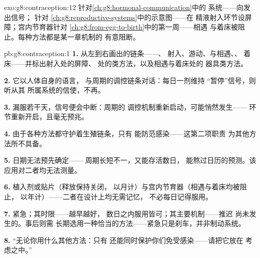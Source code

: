 \begin{solution}{exo:g8:contraception:12}
针对\cref{ch:g8:hormonal-communication}中的
系统——向发出信号；
针对
\cref{ch:g8:reproductive-systems}中的示意图——在
精液射入环节设屏障；宫内节育器针对
\cref{ch:g8:from-egg-to-birth}中的第一周——相遇
与着床被阻止。每种方法都是某一章机制的
有意阻断。
\end{solution}

\begin{solution}{pb:g8:contraception:1}
\textbf{1.} 从左到右画出的链条——、
射入、游动、与相遇、、
着床——并标出射入处的屏障、
处的类方法，以及相遇与着床处的
器具类方法。

\textbf{2.} 它以人体自身的语言，
与周期的调控链条对话：每日一剂维持
“暂停”信号，则听从其
所属系统的信使，不再。

\textbf{3.} 漏服若干天，信号便会中断：周期的
调控机制重新启动，可能悄然发生——
环节重新开启，且毫无预兆。

\textbf{4.} 由于各种方法都守护着生殖链条，只有
能防范感染——这第二项职责
为其他方法所不具备。

\textbf{5.} 日期无法预先确定——
周期长短不一，又能存活数日，
能熬过日历的预测。该应用对二者均无法测量。

\textbf{6.} 植入剂或贴片（释放保持关闭，
以月计）与宫内节育器（相遇与着床均被阻止，
以年计）——二者在设计上均无需记忆，
不必每日记得服用。

\textbf{7.} 紧急；其时限——越早越好，
数日之内服用皆可；其主要机制——推迟
尚未发生的。事后则需
长期选用一种恰当的方法——紧急只是刹车，并非制动系统。

\textbf{8.} “无论你用什么其他方法：只有
还能同时保护你们免受感染——请把它放在
考虑之中。”


\end{solution}
